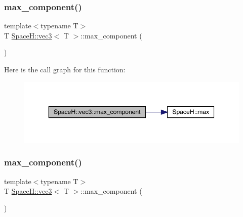 \subsubsection{\texorpdfstring{max\+\_\+component()}{max\_component()}\hspace{0.1cm}{\footnotesize\ttfamily [3/4]}}
{\footnotesize\ttfamily template$<$typename T$>$ \\
T \mbox{\hyperlink{struct_space_h_1_1vec3}{Space\+H\+::vec3}}$<$ T $>$\+::max\+\_\+component (\begin{DoxyParamCaption}{ }\end{DoxyParamCaption})\hspace{0.3cm}{\ttfamily [inline]}}

Here is the call graph for this function\+:
\nopagebreak
\begin{figure}[H]
\begin{center}
\leavevmode
\includegraphics[width=350pt]{struct_space_h_1_1vec3_a5bf7ae47f97a2269748d66933d719bd9_cgraph}
\end{center}
\end{figure}
\mbox{\label{struct_space_h_1_1vec3_a5bf7ae47f97a2269748d66933d719bd9}} 
\subsubsection{\texorpdfstring{max\+\_\+component()}{max\_component()}\hspace{0.1cm}{\footnotesize\ttfamily [4/4]}}
{\footnotesize\ttfamily template$<$typename T$>$ \\
T \mbox{\hyperlink{struct_space_h_1_1vec3}{Space\+H\+::vec3}}$<$ T $>$\+::max\+\_\+component (\begin{DoxyParamCaption}{ }\end{DoxyParamCaption})\hspace{0.3cm}{\ttfamily [inline]}}

